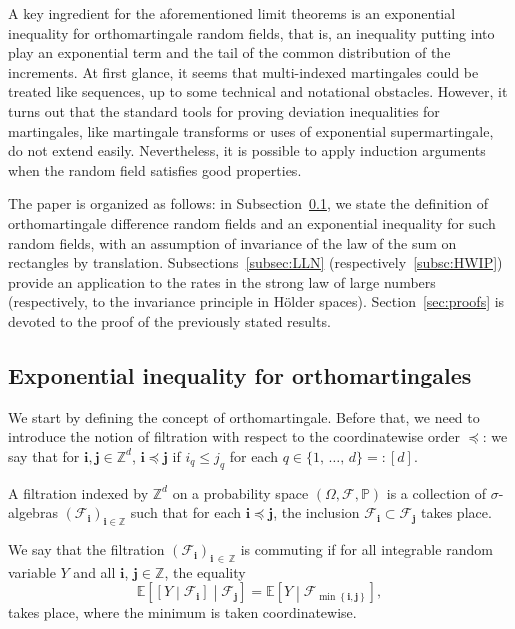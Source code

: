 \documentclass[AHL,Unicode,longabstracts,published]{cedram}
\newcommand{\f}{\mathcal{F}}
\newcommand\PP{\mathbb{P}}
\newcommand\Z{\mathbb{Z}}
\newcommand{\bbE}{\mathbb{E}}
\newcommand\ens[1]{\{ #1\}}
\newcommand{\pr}[1]{(#1)}
\newcommand{\gri}{\bm{i}}
\newcommand{\grj}{\bm{j}}
\newcommand{\imd}{\preccurlyeq}
\begin{document}
A key ingredient for the aforementioned limit theorems is an exponential inequality for orthomartingale random fields, that is, an inequality putting into play an exponential term and the tail of the common distribution of the increments. At first glance, it seems that multi-indexed martingales could be treated like sequences, up to some technical and notational obstacles. However, it turns out that the standard tools for proving deviation inequalities for martingales, like martingale transforms or uses of exponential supermartingale, do not extend easily. Nevertheless, it is possible to apply induction arguments when the random field satisfies good properties.

The paper is organized as follows: in Subsection~\ref{subsec:expo_ineg}, we state the definition of orthomartingale difference random fields and an exponential inequality for such random fields, with an assumption of invariance of the law of the sum on rectangles by translation. Subsections~\ref{subsec:LLN} (respectively~\ref{subsc:HWIP}) provide an application to the rates in the strong law of large numbers (respectively, to the invariance principle in H\"older spaces). Section~\ref{sec:proofs} is devoted to the proof of the previously stated results.

\subsection{Exponential inequality for orthomartingales}\label{subsec:expo_ineg}

We start by defining the concept of orthomartingale. Before that, we need to introduce the notion of filtration with respect to the coordinatewise order $\imd$: we say that for $\gri,\grj\in\Z^d$, $\gri\imd\grj$ if $i_q\leq j_q$ for each $q\in \ens{1,\,\dots,\,d}=:[d]$.

\begin{defi}
A filtration indexed by $\Z^d$ on a probability space $\pr{\Omega,\f,\PP}$ is a collection of $\sigma$-algebras $\pr{\f_{\gri}}_{\gri\in \Z}$ such that for each $\gri\imd\grj$, the inclusion $\f_{\gri}\subset
\f_{\grj}$ takes place.
\end{defi}

\begin{defi}
We say that the filtration $\pr{\f_{\gri}}_{\gri\,\in\,\Z}$ is commuting if for all integrable random variable $Y$ and all $\gri$, $\grj\in\Z$, the equality
\begin{equation}
\bbE\left[\left[Y\middle| \f_{\gri}\right]\middle|\f_{\grj}\right] = \bbE\left[Y\middle| \f_{\min\left\{\gri,\grj\right\}}\right],
\end{equation}
takes place, where the minimum is taken coordinatewise.
\end{defi}
\end{document}
